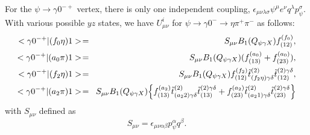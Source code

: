 For the $\psi\to\gamma 0^{-+}$ vertex, there is only one
independent coupling, $\epsilon_{\mu\nu\lambda\sigma}\psi^\mu
e^\nu q^\lambda p^\sigma_\psi$. With various possible $yz$ states,
we have $U^i_{\mu\nu}$ for $\psi\to\gamma 0^-\to\eta\pi^+\pi^-$ as
follows:
\begin{eqnarray}
<\gamma 0^{-+}|(f_0\eta)1> \!&=&\! S_{\mu\nu}
                          B_1(Q_{\psi\gamma X})f_{(12)}^{(f_0)},\\
<\gamma 0^{-+}|(a_0\pi)1> \!&=&\! S_{\mu\nu}
                          B_1(Q_{\psi\gamma X})
                         (f_{(13)}^{(a_0)}+f_{(23)}^{(a_0)}),\\
<\gamma 0^{-+}|(f_2\eta)1> \!&=&\! S_{\mu\nu} B_1(Q_{\psi\gamma
X})f_{(12)}^{(f_2)}
\tilde t^{(2)}_{(f_2\eta)\gamma\delta}\tilde t_{(12)}^{(2)\gamma\delta}, \\
<\gamma 0^{-+}|(a_2\pi)1> \!&=&\! S_{\mu\nu} B_1(Q_{\psi\gamma X})
\Bigl\{f_{(13)}^{(a_2)} \tilde t^{(2)}_{(a_22)\gamma\delta}\tilde
t_{(13)}^{(2)\gamma\delta} +f_{(23)}^{(a_2)} \tilde
t^{(2)}_{(a_21)\gamma\delta}\tilde
                t_{(23)}^{(2)\gamma\delta}\Bigr\}
\end{eqnarray}
with $S_{\mu\nu}$ defined as
\begin{equation}
\label{smunu}
S_{\mu\nu}=\epsilon_{\mu\nu\alpha\beta}p_\psi^{\alpha}q^\beta .
\end{equation}

